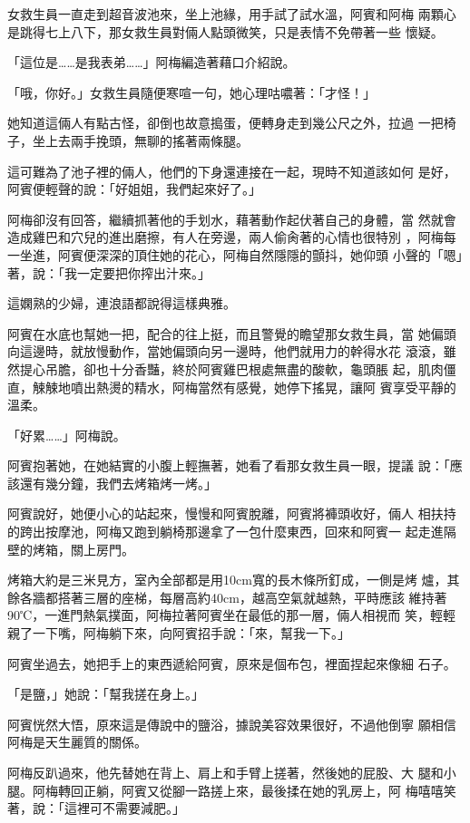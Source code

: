 女救生員一直走到超音波池來，坐上池緣，用手試了試水溫，阿賓和阿梅
兩顆心是跳得七上八下，那女救生員對倆人點頭微笑，只是表情不免帶著一些
懷疑。

「這位是……是我表弟……」阿梅編造著藉口介紹說。

「哦，你好。」女救生員隨便寒喧一句，她心理咕噥著：「才怪！」

她知道這倆人有點古怪，卻倒也故意搗蛋，便轉身走到幾公尺之外，拉過
一把椅子，坐上去兩手挽頭，無聊的搖著兩條腿。

這可難為了池子裡的倆人，他們的下身還連接在一起，現時不知道該如何
是好，阿賓便輕聲的說：「好姐姐，我們起來好了。」

阿梅卻沒有回答，繼續抓著他的手划水，藉著動作起伏著自己的身體，當
然就會造成雞巴和穴兒的進出磨擦，有人在旁邊，兩人偷肏著的心情也很特別
，阿梅每一坐進，阿賓便深深的頂住她的花心，阿梅自然隱隱的顫抖，她仰頭
小聲的「嗯」著，說：「我一定要把你搾出汁來。」

這嫻熟的少婦，連浪語都說得這樣典雅。

阿賓在水底也幫她一把，配合的往上挺，而且警覺的瞻望那女救生員，當
她偏頭向這邊時，就放慢動作，當她偏頭向另一邊時，他們就用力的幹得水花
滾滾，雖然提心吊膽，卻也十分香豔，終於阿賓雞巴根處無盡的酸軟，龜頭脹
起，肌肉僵直，觫觫地噴出熱燙的精水，阿梅當然有感覺，她停下搖晃，讓阿
賓享受平靜的溫柔。

「好累……」阿梅說。

阿賓抱著她，在她結實的小腹上輕撫著，她看了看那女救生員一眼，提議
說：「應該還有幾分鐘，我們去烤箱烤一烤。」

阿賓說好，她便小心的站起來，慢慢和阿賓脫離，阿賓將褲頭收好，倆人
相扶持的跨出按摩池，阿梅又跑到躺椅那邊拿了一包什麼東西，回來和阿賓一
起走進隔壁的烤箱，關上房門。

烤箱大約是三米見方，室內全部都是用10cm寬的長木條所釘成，一側是烤
爐，其餘各牆都搭著三層的座梯，每層高約40cm，越高空氣就越熱，平時應該
維持著90℃，一進門熱氣撲面，阿梅拉著阿賓坐在最低的那一層，倆人相視而
笑，輕輕親了一下嘴，阿梅躺下來，向阿賓招手說：「來，幫我一下。」

阿賓坐過去，她把手上的東西遞給阿賓，原來是個布包，裡面捏起來像細
石子。

「是鹽，」她說：「幫我搓在身上。」

阿賓恍然大悟，原來這是傳說中的鹽浴，據說美容效果很好，不過他倒寧
願相信阿梅是天生麗質的關係。

阿梅反趴過來，他先替她在背上、肩上和手臂上搓著，然後她的屁股、大
腿和小腿。阿梅轉回正躺，阿賓又從腳一路搓上來，最後揉在她的乳房上，阿
梅嘻嘻笑著，說：「這裡可不需要減肥。」

